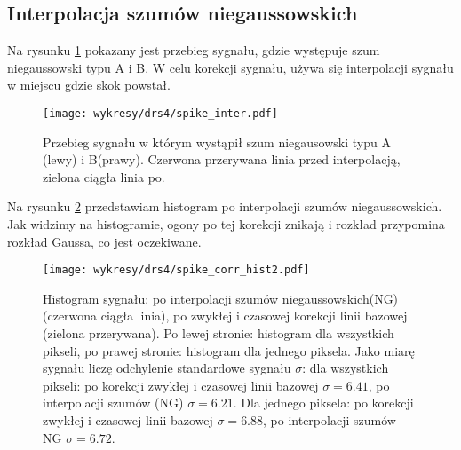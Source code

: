 \documentclass[a4paper,11pt,twoside]{article}
\begin{document}
\subsection{Interpolacja szumów niegaussowskich}
Na rysunku \ref{fig:spike_corr} pokazany jest przebieg sygnału, gdzie występuje szum niegaussowski typu A i B. W celu korekcji sygnału, używa się interpolacji sygnału w miejscu gdzie skok powstał.
\begin{figure}[H] 
\centering
\texttt{[image: wykresy/drs4/spike\_inter.pdf]}
\caption{Przebieg sygnału w którym wystąpił szum niegausowski typu A (lewy) i B(prawy). Czerwona przerywana linia przed interpolacją, zielona ciągła linia po.}
\label{fig:spike_corr}
\end{figure}
Na rysunku \ref{fig:spike_hist} przedstawiam histogram po interpolacji szumów niegaussowskich. Jak widzimy na histogramie, ogony po tej korekcji znikają i rozkład przypomina rozkład Gaussa, co jest oczekiwane.
\begin{figure}[H] 
\centering
\texttt{[image: wykresy/drs4/spike\_corr\_hist2.pdf]}
\caption{Histogram sygnału: po interpolacji szumów niegaussowskich(NG) (czerwona ciągła linia), po zwykłej i czasowej korekcji linii bazowej (zielona przerywana). Po lewej stronie: histogram dla wszystkich pikseli, po prawej stronie: histogram dla jednego piksela.
Jako miarę sygnału liczę odchylenie standardowe sygnału $\sigma$: dla wszystkich pikseli: po korekcji zwykłej i czasowej linii bazowej $\sigma = 6.41$, po interpolacji szumów (NG) $\sigma = 6.21$. Dla jednego piksela: po korekcji zwykłej i czasowej linii bazowej $\sigma = 6.88$, po interpolacji szumów NG $\sigma = 6.72$.}
\label{fig:spike_hist}
\end{figure}
\end{document}
